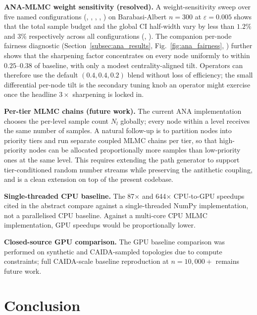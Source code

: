 \documentclass[pdflatex,sn-mathphys-num]{sn-jnl}
\theoremstyle{thmstyleone}%
\theoremstyle{thmstyletwo}%
\theoremstyle{thmstylethree}%
\begin{document}
\par\textbf{ANA-MLMC weight sensitivity (resolved).} A weight-sensitivity sweep over five named
configurations (, , ,
, ) on Barabasi-Albert $n=300$ at $\varepsilon=0.005$ shows
that the total sample budget and the global CI half-width vary by less than $1.2\%$ and $3\%$
respectively across all configurations (,
). The companion per-node fairness
diagnostic (Section~\ref{subsec:ana_results}, Fig.~\ref{fig:ana_fairness},
) further shows that the sharpening factor concentrates
on every node uniformly to within $0.25$--$0.38$ of baseline, with only a modest
centrality-aligned tilt. Operators can therefore use the default $(0.4,0.4,0.2)$ blend without
loss of efficiency; the small differential per-node tilt is the secondary tuning knob an operator
might exercise once the headline $3\!\times$ sharpening is locked in.

\par\textbf{Per-tier MLMC chains (future work).} The current ANA implementation chooses the
per-level sample count $N_l$ globally; every node within a level receives the same number of
samples. A natural follow-up is to partition nodes into priority tiers and run separate coupled
MLMC chains per tier, so that high-priority nodes can be allocated proportionally more samples
than low-priority ones at the same level. This requires extending the path generator to support
tier-conditioned random number streams while preserving the antithetic coupling, and is a clean
extension on top of the present codebase.

\par\textbf{Single-threaded CPU baseline.} The 87$\times$ and 644$\times$ CPU-to-GPU speedups
cited in the abstract compare against a single-threaded NumPy implementation, not a parallelised
CPU baseline. Against a multi-core CPU MLMC implementation, GPU speedups would be proportionally
lower.

\par\textbf{Closed-source GPU comparison.} The GPU baseline comparison was performed on synthetic
and CAIDA-sampled topologies due to compute constraints; full CAIDA-scale baseline reproduction
at $n=10{,}000+$ remains future work.

\section{Conclusion}
\end{document}
